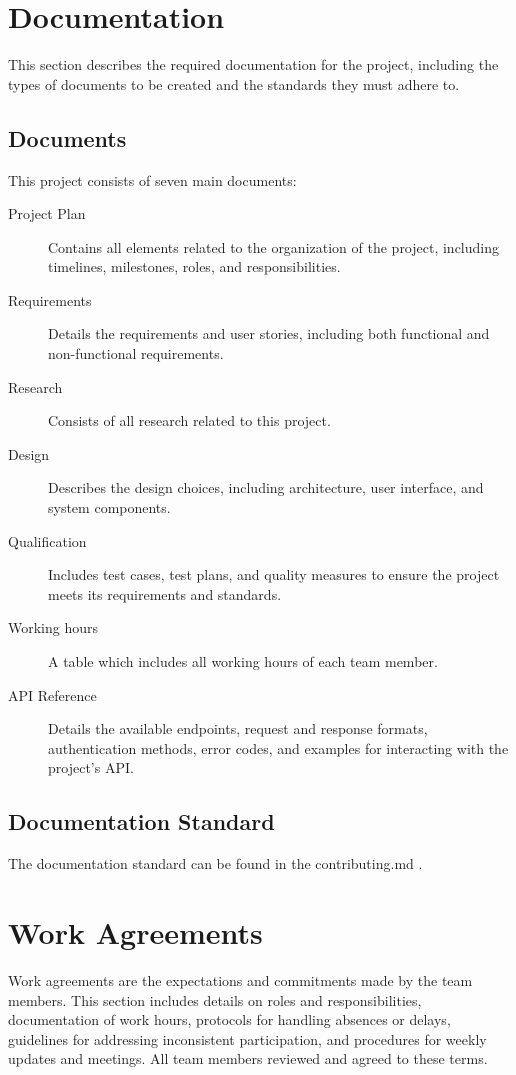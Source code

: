 \documentclass{projdoc}
\begin{document}
\section{Documentation}

This section describes the required documentation for the project, including the
types of documents to be created and the standards they must adhere to.

\subsection{Documents}

This project consists of seven main documents:\noparbreak
\begin{description}
	\item[Project Plan] Contains all elements related to the organization of the
		project, including timelines, milestones, roles, and responsibilities.
	\item[Requirements] Details the requirements and user stories, including both
		functional and non-functional requirements.
	\item[Research] Consists of all research related to this project.
	\item[Design] Describes the design choices, including architecture, user interface,
		and system components.
	\item[Qualification] Includes test cases, test plans, and quality measures to
		ensure the project meets its requirements and standards.
	\item[Working hours] A table which includes all working hours of each team member.
	\item[API Reference] Details the available endpoints, request and response formats,
		authentication methods, error codes, and examples for interacting with the
		project's API.
\end{description}

\subsection{Documentation Standard}

The documentation standard can be found in the contributing.md
\autocite{crepe:docs-standard}.

\section{Work Agreements}

Work agreements are the expectations and commitments made by the team members. This
section includes details on roles and responsibilities, documentation of work hours,
protocols for handling absences or delays, guidelines for addressing inconsistent
participation, and procedures for weekly updates and meetings. All team members
reviewed and agreed to these terms.
\end{document}
